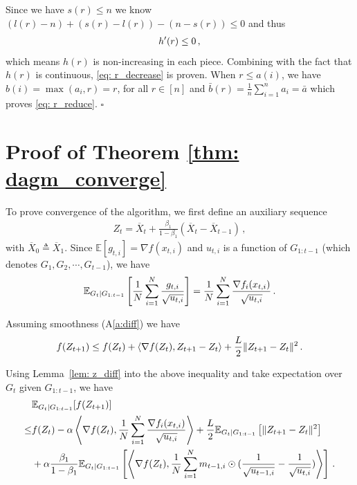 \documentclass{article} %
\begin{document}
Since we have $s(r) \leq n$ we know $(l(r) - n) + (s(r) - l(r)) - (n-s(r)) \leq 0$ and thus
\begin{align}\notag
h'(r) \leq 0 \, ,
\end{align}
which means $h(r)$ is non-increasing in each piece. Combining with the fact that $h(r)$ is continuous, \eqref{eq: r_decrease} is proven.
When $r \leq a(i)$, we have $b(i) = \max(a_i,r) = r$, for all $r \in [n]$ and $\bar b(r) = \frac{1}{n}\sum_{i=1}^n a_i = \bar a$ which proves \eqref{eq: r_reduce}.
\hfill $\square$


\vspace{0.2in}

\section{Proof of Theorem \ref{thm: dagm_converge}}\label{app: proof_thm_adm}


To prove convergence of the algorithm, we first define an auxiliary sequence 
\begin{align}\label{eq: seq_z}
Z_{t} = \overline X_t + \frac{\beta_1}{1-\beta_1} (\overline X_t - \overline X_{t-1}) \, ,
\end{align}
with $\overline X_{0} \triangleq \overline X_1$.
Since $\mathbb E[g_{t,i}] = \nabla f(x_{t,i})$ and $u_{t,i}$ is a function of $G_{1:t-1}$ (which denotes $G_1,G_2,\cdots,G_{t-1}$), we have 
\begin{align}\notag
\mathbb E_{G_t|G_{1:t-1}} \left[\frac{1}{N} \sum_{i=1}^N \frac{g_{t,i}}{\sqrt{u_{t,i}}}\right] =\frac{1}{N} \sum_{i=1}^N \frac{\nabla f_i(x_{t,i})}{\sqrt{u_{t,i}}} \, .
\end{align}

Assuming smoothness (A\ref{a:diff}) we have 
\begin{align}\notag
f( Z_{t+1}) \leq f( Z_{t}) + \langle \nabla f( Z_{t}),  Z_{t+1}-  Z_{t} \rangle + \frac{L}{2}\| Z_{t+1}-  Z_{t}\|^2 \, .
\end{align}

Using Lemma~\ref{lem: z_diff} into the above inequality and take expectation over $G_{t}$ given $G_{1:t-1}$, we have 
\begin{align}\notag
\begin{split}
&\mathbb E_{G_t|G_{1:t-1}} [f( Z_{t+1})]\\
\leq & f( Z_{t})  - \alpha  \left \langle \nabla f( Z_{t}), \frac{1}{N} \sum_{i=1}^N \frac{\nabla f_i(x_{t,i})}{\sqrt{u_{t,i}}}  \right \rangle + \frac{L}{2} \mathbb E_{G_t|G_{1:t-1}}\left[\| Z_{t+1}-  Z_{t}\|^2 \right]   \\
&+ \alpha \frac{\beta_1}{1-\beta_1}  \mathbb E_{G_t|G_{1:t-1}} \left [\left \langle \nabla f( Z_{t}) , \frac{1}{N} \sum_{i=1}^N m_{t-1	,i} \odot (\frac{1}{\sqrt{u_{t-1,i}}} - \frac{1}{\sqrt{u_{t,i}}}) \right \rangle \right] \, .
\end{split}
\end{align}
\end{document}
